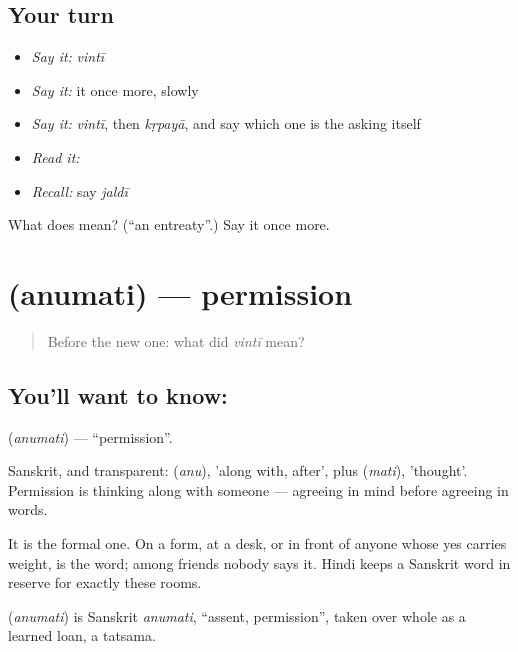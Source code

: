\subsection*{Your turn}
\begin{itemize}
\raggedright
  \item \emph{Say it:} \emph{vintī}
  \item \emph{Say it:} it once more, slowly
  \item \emph{Say it:} \emph{vintī}, then \emph{kṛpayā}, and say which one is the asking itself
  \item \emph{Read it:} \textbf{}
  \item \emph{Recall:} say \emph{jaldī}
\end{itemize}

\begin{tcolorbox}[breakable,colback=teal!4,colframe=teal!35!black,title={Before you move on}]
What does  mean? (\textquotedblleft{}an entreaty\textquotedblright{}.) Say it once more.
\end{tcolorbox}
\section[\texorpdfstring{\hi{अनुमति} (anumati)}{अनुमति (anumati)}]{ (anumati) — permission}

\label{lesson:HI-C65-permission}



\begin{quote}
Before the new one: what did \emph{vintī} mean?
\end{quote}

\subsection*{You'll want to know: }
\textbf{} (\emph{anumati}) — \textquotedblleft{}permission\textquotedblright{}.

Sanskrit, and transparent:  (\emph{anu}), 'along with, after', plus  (\emph{mati}), 'thought'. Permission is thinking along with someone — agreeing in mind before agreeing in words.

It is the formal one. On a form, at a desk, or in front of anyone whose yes carries weight,  is the word; among friends nobody says it. Hindi keeps a Sanskrit word in reserve for exactly these rooms.

\begin{cousinweb}
\textbf{} (\emph{anumati}) is Sanskrit \emph{anumati}, \textquotedblleft{}assent, permission\textquotedblright{}, taken over whole as a learned loan, a tatsama.
\end{cousinweb}


